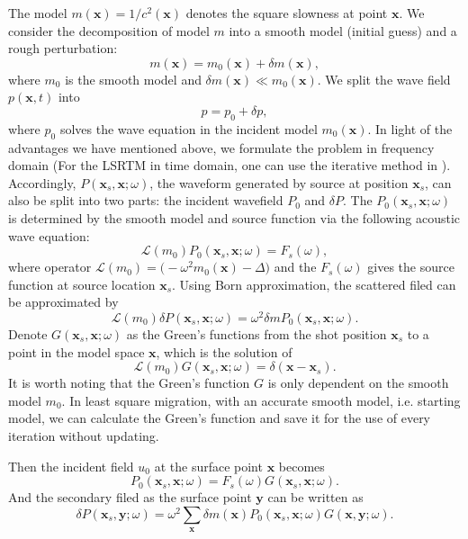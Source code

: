 \documentclass[11pt]{article}
\newcommand{\cL}{\mathcal{L}}
\newcommand{\bx}{\boldsymbol{x}}
\newcommand{\by}{\boldsymbol{y}}
\theoremstyle{plain}
\theoremstyle{definition}
\theoremstyle{remark}
\numberwithin{equation}{section}
\begin{document}
The model $m(\bx)=1/c^2(\bx)$ denotes the square slowness at point $\bx$. 
We consider the decomposition of model $m$ into a smooth model (initial guess) and a rough perturbation:
\begin{equation}
m(\bx)=m_0(\bx)+\delta m(\bx),
\end{equation} 
where $m_0$ is the smooth model and $\delta m(\bx) \ll m_0(\bx)$. We split the wave field $p(\bx,t)$ into 
\begin{equation}
p=p_0+\delta p,
\end{equation}
where $p_0$ solves the wave equation in the incident model $m_0(\bx)$.
In light of the advantages we have mentioned above, we formulate the problem in frequency domain (For the LSRTM in time domain, one can use the iterative method in \cite{DonCaiAO2012}).
Accordingly, $P(\bx_s,\bx;\omega)$, the waveform generated by source at position $\bx_s$, can also be split into two parts: the incident wavefield $P_0$
and $\delta P$. The $P_0(\bx_s,\bx;\omega)$ is determined by the smooth model and source function via the following acoustic wave equation:
\begin{equation}
\cL( m_0) P_0(\bx_s,\bx; \omega)=F_s(\omega),
\end{equation} 
where operator $\cL( m_0)=\Big(-\omega^2 m_0(\bx)-\Delta\Big)$ and the $F_s(\omega)$ gives the source function at source location $\bx_s$. 
Using Born approximation, the scattered filed can be approximated by  
\begin{equation}
\cL( m_0)\delta P(\bx_s,\bx;\omega) =\omega^2 \delta m P_0(\bx_s,\bx;\omega).
\end{equation}
Denote $G(\bx_s,\bx; \omega)$ as the Green's functions from the shot position $\bx_s$ to a point in the model space $\bx$, which is the solution of 
\begin{equation}
\cL(m_0)G(\bx_s,\bx;\omega)=\delta(\bx-\bx_s).
\end{equation}
It is worth noting that the Green's function $G$ is only dependent on the smooth model 
$m_0$. In least square migration, with an accurate smooth model, i.e. starting model, we can calculate the Green's function and save it for the use of every iteration without updating. 
  
Then the incident field $u_0$ at the surface point $\bx$ becomes
\begin{equation}
P_0(\bx_s,\bx; \omega)=F_s(\omega)G(\bx_s,\bx; \omega).
\end{equation}
And the secondary filed as the surface point $\by$ can be written as 
\begin{equation}
\delta P(\bx_s,\by; \omega)=\omega^2 \sum_{\bx}  \delta m(\bx) P_0(\bx_s,\bx;\omega) G(\bx,\by;\omega).
\end{equation}
\end{document}
